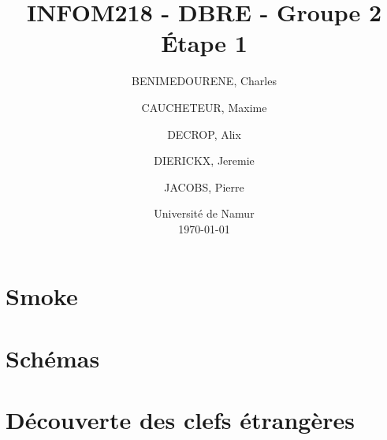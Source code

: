 \documentclass[french]{report}
\title{INFOM218 - DBRE - Groupe 2 \\ \Huge Étape 1}
\author{BENIMEDOURENE, Charles \and CAUCHETEUR, Maxime \and DECROP, Alix \and DIERICKX, Jeremie \and JACOBS, Pierre}
\date{{\large Université de Namur} \\ \today}
\begin{document}
	
	\maketitle
	\newpage
	\tableofcontents
	
	\newpage
	
	\section{Smoke}
	\section{Schémas}
	\section{Découverte des clefs étrangères}
	
\end{document}
